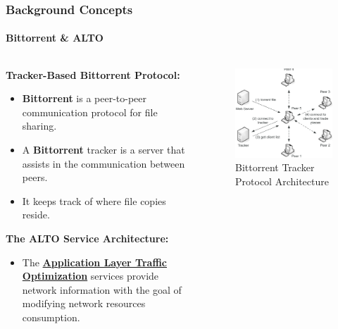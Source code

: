 \documentclass[10pt,    %
    english,            %
    xcolor=table,       %
    envcountsect,        %
    aspectratio=169     %
]{beamer}
\begin{document}
\begin{frame}
    \frametitle{Background Concepts}
    \framesubtitle{Bittorrent \& ALTO}

    \begin{columns}
        \begin{column}{.55\textwidth}
            \textbf{Tracker-Based Bittorrent Protocol:}
            \begin{itemize}
                \item \textbf{Bittorrent} is a peer-to-peer communication protocol for file sharing.
                \item A \textbf{Bittorrent} tracker is a server that assists in the communication between peers.
                \item It keeps track of where file copies reside.
            \end{itemize}
            \textbf{The ALTO Service Architecture:}
            \begin{itemize}
                \item The \textbf{\href{https://tools.ietf.org/html/rfc7285}{Application Layer Traffic Optimization}} services provide network information with the goal of modifying network resources consumption.
            \end{itemize}
        \end{column}
        \hfill
        \begin{column}{.35\textwidth}
            \begin{figure}[h!]
                \centering
                \includegraphics[width=\textwidth]{./images/bit-torrent.png}
                \caption{Bittorrent Tracker Protocol Architecture}
            \end{figure}
        \end{column}
    \end{columns}

\end{frame}
\end{document}
